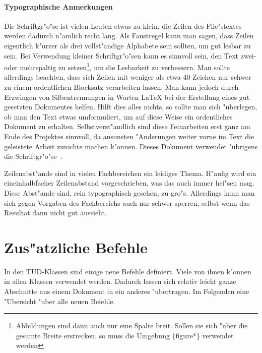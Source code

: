 \documentclass[twoside,colorback,accentcolor=tud4c,11pt]{tudreport}
\begin{document}
    \paragraph{Typographische Anmerkungen}
    Die Schriftgr"o"se \textaccent{9.5pt} ist vielen Leuten etwas zu klein,
    die Zeilen des Flie"stextes werden dadurch n"amlich recht lang.
    Als Faustregel kann man sagen, dass Zeilen eigentlich k"urzer als drei
    vollst"andige Alphabete sein sollten, um gut
    lesbar zu sein. Bei Verwendung kleiner Schriftgr"o"sen kann es sinnvoll
    sein, den Text zwei- oder mehrspaltig zu setzen\footnote{Abbildungen sind
    dann auch nur eine Spalte breit. Sollen sie sich "uber die gesamte Breite
    erstrecken, so muss die Umgebung \{figure*\} verwendet
    werden}, um die Lesbarkeit zu
    verbessern. Man sollte allerdings beachten, dass sich Zeilen mit weniger 
    als etwa 40 Zeichen nur schwer zu einem ordentlichen Blocksatz verarbeiten
    lassen. Man kann jedoch durch Erzwingen von Silbentrennungen in
    Worten \LaTeX{} bei der Erstellung eines gut gesetzten Dokumentes helfen.
    Hilft dies alles nichts, so sollte man sich "uberlegen, ob man den
    Text etwas umformuliert, um auf diese Weise ein ordentliches Dokument zu
    erhalten. Selbstverst"andlich sind diese Feinarbeiten erst ganz am Ende
    des Projektes sinnvoll, da ansonsten "Anderungen weiter vorne im Text die
    geleistete Arbeit zunichte machen k"onnen. Dieses Dokument verwendet "ubrigens die
    Schriftgr"o"se~.

    Zeilenabst"ande sind in vielen Fachbereichen ein leidiges Thema. H"aufig
    wird ein \glqq eineinhalbfacher\grqq{} Zeilenabstand vorgeschrieben, was das
    auch immer hei"sen mag. Diese Abst"ande sind, rein typographisch
    gesehen, zu gro"s. Allerdings kann man sich gegen Vorgaben des
    Fachbereichs auch nur schwer sperren, selbst wenn das Resultat dann nicht
    gut aussieht.

  \section{Zus"atzliche Befehle}\label{sec_befehle}

    In den TUD-Klassen sind einige neue Befehle definiert. Viele von ihnen
    k"onnen in allen Klassen verwendet werden. Dadurch lassen sich relativ
    leicht ganze Abschnitte aus einem Dokument in ein anderes "ubertragen. Im
    Folgenden eine "Ubersicht "uber alle neuen Befehle.
\end{document}
